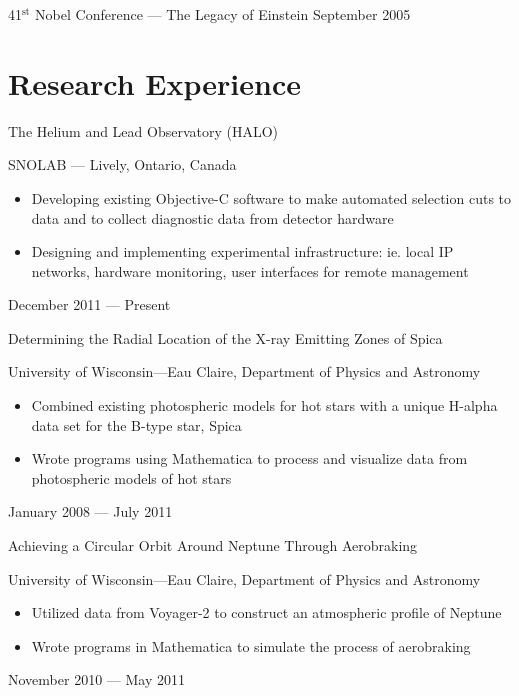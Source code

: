 \documentclass[margin,line,letterpaper]{res}
\begin{document}
\begin{resume}
\object
{41$^\text{st}$ Nobel Conference --- The Legacy of Einstein}
{}
{September 2005}



\newpage

\section{Research Experience}



\object
{The Helium and Lead Observatory (HALO)}
{SNOLAB --- Lively, Ontario, Canada \noemph
	\begin{itemize}
		\item Developing existing Objective-C software to make automated selection cuts to data and to collect diagnostic data from detector hardware
		\item Designing and implementing experimental infrastructure: ie. local IP networks, hardware monitoring, user interfaces for remote management
	\end{itemize}
 }
{December 2011 --- Present}


\objectLarge
{Determining the Radial Location of the X-ray Emitting}
{Zones of Spica}
{University of Wisconsin---Eau Claire, Department of Physics and Astronomy \noemph
\begin{itemize}
		\item Combined existing photospheric models for hot stars with a unique H-alpha data set for the B-type star, Spica
		\item Wrote programs using Mathematica to process and visualize data from photospheric models of hot stars
	\end{itemize}
 }
{January 2008 --- July 2011}


\objectLarge
{Achieving a Circular Orbit Around Neptune}
{Through Aerobraking}
{University of Wisconsin---Eau Claire, Department of Physics and Astronomy \noemph
\begin{itemize}
		\item Utilized data from Voyager-2 to construct an atmospheric profile of Neptune
		\item Wrote programs in Mathematica to simulate the process of aerobraking
	\end{itemize}
 }
{November 2010 --- May 2011}


\sectSep


\end{resume}
\end{document}
